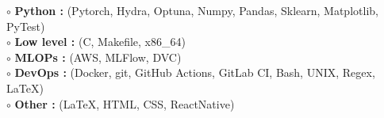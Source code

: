 

	$ \circ $ \textbf{Python :}  (Pytorch, Hydra, Optuna, Numpy, Pandas, Sklearn, Matplotlib, PyTest) \\
	$ \circ $ \textbf{Low level :}  (C, Makefile, x86\_64)  \\
	$ \circ $ \textbf{MLOPs :}  (AWS, MLFlow, DVC) \\
	$ \circ $ \textbf{DevOps :}  (Docker, git, GitHub Actions, GitLab CI, Bash, UNIX, Regex, LaTeX) \\
	$ \circ $ \textbf{Other :}  (LaTeX, HTML, CSS, ReactNative) \\


\sectionspace %
